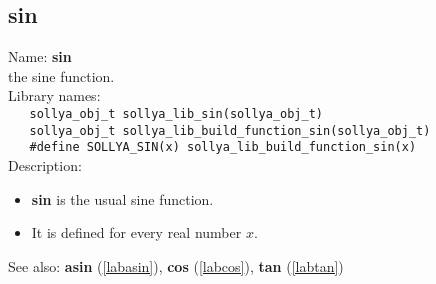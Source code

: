 \subsection{sin}
\label{labsin}
\noindent Name: \textbf{sin}\\
\phantom{aaa}the sine function.\\[0.2cm]
\noindent Library names:\\
\verb|   sollya_obj_t sollya_lib_sin(sollya_obj_t)|\\
\verb|   sollya_obj_t sollya_lib_build_function_sin(sollya_obj_t)|\\
\verb|   #define SOLLYA_SIN(x) sollya_lib_build_function_sin(x)|\\[0.2cm]
\noindent Description: \begin{itemize}

\item \textbf{sin} is the usual sine function.

\item It is defined for every real number $x$.
\end{itemize}
See also: \textbf{asin} (\ref{labasin}), \textbf{cos} (\ref{labcos}), \textbf{tan} (\ref{labtan})

